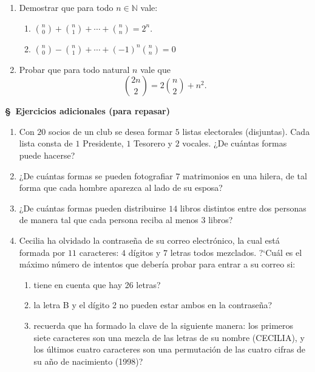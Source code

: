 \documentclass[a4paper,12pt,twoside,spanish,reqno]{amsbook}
\numberwithin{equation}{section}
\begin{document}
\begin {enumerate}
\item Demostrar que para todo $n \in \mathbb N$ vale:
\begin{enumerate}
  \item $\displaystyle{\binom{n}{0} + \binom{n}{1} + \cdots + \binom{n}{n} = 2^n}$.
\medskip
  \item $\displaystyle{\binom{n}{0} - \binom{n}{1} + \cdots + (-1)^n\binom{n}{n} = 0}$
  \end{enumerate}


\item Probar que para todo natural $n$ vale que 
\begin{equation*}
    \binom{2n}{2} = 2 \binom{n}{2} + n^2.
\end{equation*}

\end{enumerate}




\begin{center}
    \textbf{\large \S\, Ejercicios adicionales (para repasar)}
\end{center}


\begin{enumerate}[resume]

\item Con $20$ socios de un club se desea formar $5$ listas electorales (disjuntas).
Cada lista consta de $1$ Presidente, $1$ Tesorero y $2$ vocales.  ¿De cuántas
formas puede hacerse?


\item ¿De cuántas formas se pueden fotografiar $7$ matrimonios en una hilera,
de tal forma que cada hombre aparezca al lado de su esposa?


\item ¿De cuántas formas pueden distribuirse $14$ libros distintos entre dos
personas de manera tal que cada persona reciba al menos $3$ libros?


\item
Cecilia ha olvidado la contraseña de su correo electrónico, la cual est\'a formada por $11$ caracteres: $4$ d\'igitos y $7$ letras todos mezclados. ?`Cu\'al es el m\'aximo n\'umero de intentos que deber\'ia probar para entrar a su correo si:
\begin{enumerate}
    \item  tiene en cuenta que hay 26 letras?
    
    \item la letra B y el d\'igito 2 no pueden estar ambos en la contraseña?
    
    \item  recuerda que ha formado la clave de la siguiente manera: los primeros siete caracteres son una mezcla de las letras de su nombre (CECILIA), y los \'ultimos cuatro caracteres son una permutaci\'on de las cuatro cifras de su a\~no de nacimiento (1998)?
\end{enumerate}


\end{enumerate}
\end{document}
